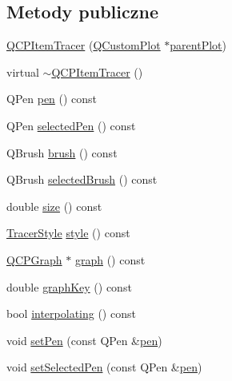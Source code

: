 \subsection*{Metody publiczne}
\begin{DoxyCompactItemize}
\item 
\hyperlink{class_q_c_p_item_tracer_adc5ca846eeac323db4aa1fc4081e36be}{Q\+C\+P\+Item\+Tracer} (\hyperlink{class_q_custom_plot}{Q\+Custom\+Plot} $\ast$\hyperlink{class_q_c_p_layerable_ab7e0e94461566093d36ffc0f5312b109}{parent\+Plot})
\item 
virtual \hyperlink{class_q_c_p_item_tracer_a43686565a9b70815915618636b9bdf0f}{$\sim$\+Q\+C\+P\+Item\+Tracer} ()
\item 
Q\+Pen \hyperlink{class_q_c_p_item_tracer_a1f51b61e98c276298a0874d5e89707f0}{pen} () const 
\item 
Q\+Pen \hyperlink{class_q_c_p_item_tracer_ad75e5d2d868dbedc176f7911091f379b}{selected\+Pen} () const 
\item 
Q\+Brush \hyperlink{class_q_c_p_item_tracer_af07527750cfb6afc3c0ba4bec012011f}{brush} () const 
\item 
Q\+Brush \hyperlink{class_q_c_p_item_tracer_afed284222253083375bfd21d3d4dbc30}{selected\+Brush} () const 
\item 
double \hyperlink{class_q_c_p_item_tracer_a2607fcb3d01e90773ea1532fd6803760}{size} () const 
\item 
\hyperlink{class_q_c_p_item_tracer_a2f05ddb13978036f902ca3ab47076500}{Tracer\+Style} \hyperlink{class_q_c_p_item_tracer_a871832dace1709f877c3136fac7ae1ec}{style} () const 
\item 
\hyperlink{class_q_c_p_graph}{Q\+C\+P\+Graph} $\ast$ \hyperlink{class_q_c_p_item_tracer_a74c90da0e6730839b8d7cf6445a4ec1f}{graph} () const 
\item 
double \hyperlink{class_q_c_p_item_tracer_a361c5c9b93bdf4588fc49bc3097529ad}{graph\+Key} () const 
\item 
bool \hyperlink{class_q_c_p_item_tracer_ab318c233fa35c17a317af38ce7b3c312}{interpolating} () const 
\item 
void \hyperlink{class_q_c_p_item_tracer_af8048636fc1ef0152e51809b008df2ca}{set\+Pen} (const Q\+Pen \&\hyperlink{class_q_c_p_item_tracer_a1f51b61e98c276298a0874d5e89707f0}{pen})
\item 
void \hyperlink{class_q_c_p_item_tracer_ae1bf70db7f13f928660168cd3e5069f3}{set\+Selected\+Pen} (const Q\+Pen \&\hyperlink{class_q_c_p_item_tracer_a1f51b61e98c276298a0874d5e89707f0}{pen})
\item 

\end{DoxyCompactItemize}
